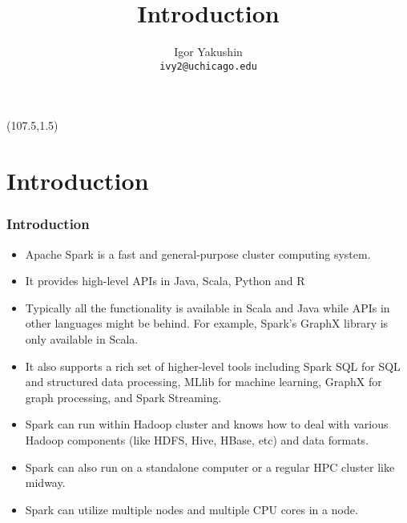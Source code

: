 \documentclass{beamer}
\title{\huge{Introduction}}
\author{Igor Yakushin \\ \texttt{ivy2@uchicago.edu}}
\date{}
\newcommand{\SPARK}{
\begin{textblock}{14}(107.5,1.5)
  \pgfuseimage{spark}
\end{textblock}
}
\begin{document}



\begin{frame}
\SPARK
\titlepage
\end{frame}


\section{Introduction}

\begin{frame}[fragile]
  \frametitle{Introduction}
  
\begin{itemize}
\item Apache Spark is a fast and general-purpose cluster computing system. 
\item It provides high-level APIs in Java, Scala, Python and R
\item Typically all the functionality is available in Scala and Java while APIs 
  in other languages might be behind. For example, Spark's GraphX library is only available in Scala.
\item It also supports a rich set of higher-level tools including Spark SQL for SQL 
  and structured data processing, MLlib for machine learning, GraphX for graph processing, and Spark Streaming.
\item Spark can run within Hadoop cluster and knows how to deal with various 
  Hadoop components (like HDFS, Hive, HBase, etc) and data formats.
\item Spark can also run on a standalone computer or a regular HPC cluster like midway.
\item Spark can utilize multiple nodes and multiple CPU cores in a node.
\end{itemize}

\end{frame}
\end{document}
